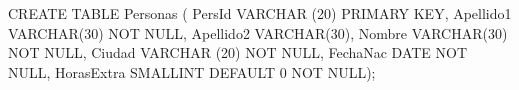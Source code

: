 \lstset{caption=Crear tabla ``personas'',label=sql:crearTablaPersonas}
\begin{SQL}
CREATE TABLE Personas (
PersId VARCHAR (20) PRIMARY KEY,
Apellido1 VARCHAR(30) NOT NULL,
Apellido2 VARCHAR(30),
Nombre VARCHAR(30) NOT NULL,
Ciudad VARCHAR (20) NOT NULL,
FechaNac DATE NOT NULL,
HorasExtra SMALLINT DEFAULT 0 NOT NULL);
\end{SQL}
